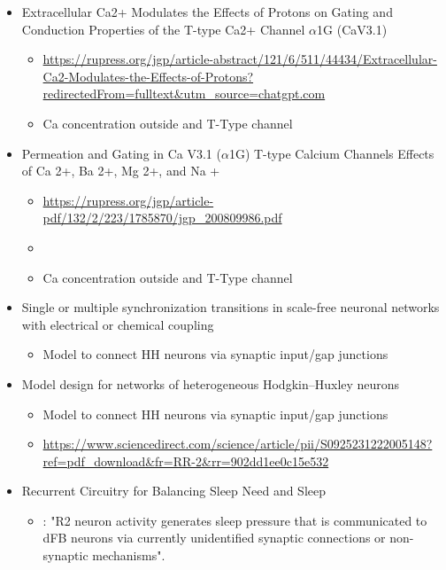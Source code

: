 \documentclass[../workflow.tex]{subfiles}
\begin{document}
\begin{itemize}
    \item Extracellular Ca2+ Modulates the Effects of Protons on Gating and Conduction Properties of the T-type Ca2+ Channel $\alpha$1G (CaV3.1)
    \begin{itemize}
        \item \url{https://rupress.org/jgp/article-abstract/121/6/511/44434/Extracellular-Ca2-Modulates-the-Effects-of-Protons?redirectedFrom=fulltext&utm_source=chatgpt.com}
        \item Ca concentration outside and T-Type channel
    \end{itemize}

    \item Permeation and Gating in Ca V3.1 ($\alpha$1G) T-type Calcium Channels Effects of Ca 2+, Ba 2+, Mg 2+, and Na +
    \begin{itemize}
        \item \url{https://rupress.org/jgp/article-pdf/132/2/223/1785870/jgp_200809986.pdf}
        \item \item Ca concentration outside and T-Type channel
    \end{itemize}

    \item Single or multiple synchronization transitions in scale-free neuronal networks with electrical or chemical coupling
    \begin{itemize}
        \item Model to connect HH neurons via synaptic input/gap junctions
    \end{itemize}

    \item Model design for networks of heterogeneous Hodgkin–Huxley neurons
    \begin{itemize}
        \item Model to connect HH neurons via synaptic input/gap junctions
        \item \url{https://www.sciencedirect.com/science/article/pii/S0925231222005148?ref=pdf_download&fr=RR-2&rr=902dd1ee0c15e532}
    \end{itemize}

    \item Recurrent Circuitry for Balancing Sleep Need and Sleep
    \begin{itemize}
        \item \cite{donleaRecurrentCircuitryBalancing2018}: "R2 neuron activity generates sleep pressure that is communicated
        to dFB neurons via currently unidentified synaptic connections or non-synaptic mechanisms".
    \end{itemize}
    

\end{itemize}
\end{document}
